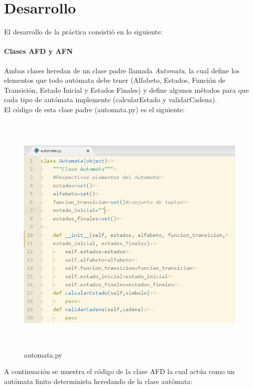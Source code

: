 \section{Desarrollo}
	El desarrollo de la práctica consistió en lo siguiente:
	\paragraph{Clases AFD y AFN}
	Ambas clases heredan de un clase padre llamada \textit{Automata}, la cual define los elementos que todo autómata debe tener (Alfabeto, Estados, Función de Transición, Estado Inicial y Estados Finales) y define algunos métodos para que cada tipo de autómata implemente (calcularEstado y validarCadena).\\
	El código de esta clase padre (automata.py) es el siguiente:
	\begin{figure}[H]
		\begin{center}
			\includegraphics[width=15cm, height=12cm]{img/automata.png}
			\caption{automata.py}
			\label{fig:tablas1}
		\end{center}
	\end{figure}	
	A continuación se muestra el código de la clase AFD la cual actúa como un autómata finito determinista heredando de la clase autómata:\\
